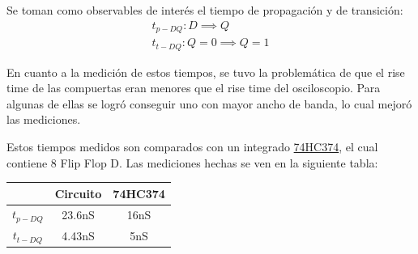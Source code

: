 Se toman como observables de interés el tiempo de propagación y de transición:
\begin{equation*}
\begin{split}
	t_{p-DQ}: D \implies Q \\
	t_{t-DQ}: Q=0 \implies Q = 1
\end{split}
\end{equation*}
 
En cuanto a la medición de estos tiempos, se tuvo la problemática de que el rise time de las compuertas eran menores que el rise time del osciloscopio. Para algunas de ellas se logró conseguir uno con mayor ancho de banda, lo cual mejoró las mediciones.

Estos tiempos medidos son comparados con un integrado \href{https://pdf1.alldatasheet.com/datasheet-pdf/view/15593/PHILIPS/74HC374.html}{74HC374}, el cual contiene 8 Flip Flop D. Las mediciones hechas se ven en la siguiente tabla:
\begin{table}[H]
\centering
\begin{tabular}{ccc}
\hline
\textit{}                               & \textbf{Circuito}         & \textbf{74HC374}     \\ \hline
\textbf{$t_{p-DQ}$}                     & 23.6nS                    & 16nS                 \\
\textbf{$t_{t-DQ}$}                     & 4.43nS                    & 5nS                  \\
\hline
\end{tabular}
\end{table}